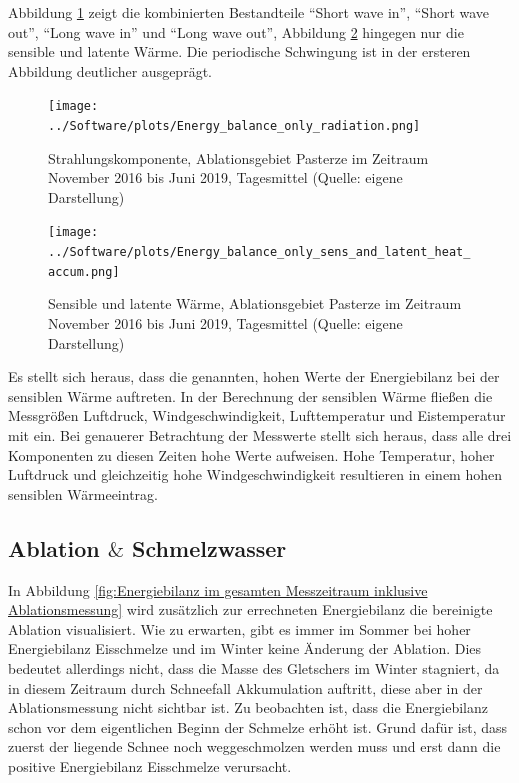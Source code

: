 \documentclass[11pt,a4paper]{article}
\begin{document}
Abbildung \ref{fig:Nettostrahlung (SW und LW) im gesamten Messzeitraum} zeigt die kombinierten Bestandteile ``Short wave in'', ``Short wave out'', ``Long wave in'' und ``Long wave out'', Abbildung \ref{fig:Sensible und latente Wärme im gesamten Messzeitraum} hingegen nur die sensible und latente Wärme. Die periodische Schwingung ist in der ersteren Abbildung deutlicher ausgeprägt.

\begin{figure}[H]
\centering
\texttt{[image: ../Software/plots/Energy\_balance\_only\_radiation.png]}
\caption[Strahlungskomponente, Ablationsgebiet Pasterze im Zeitraum November 2016 bis Juni 2019, Tagesmittel]{Strahlungskomponente, Ablationsgebiet Pasterze im Zeitraum November 2016 bis Juni 2019, Tagesmittel (Quelle: eigene Darstellung)}
\label{fig:Nettostrahlung (SW und LW) im gesamten Messzeitraum}
\end{figure}

\begin{figure}[H]
\centering
\texttt{[image: ../Software/plots/Energy\_balance\_only\_sens\_and\_latent\_heat\_accum.png]}
\caption[Sensible und latente Wärme, Ablationsgebiet Pasterze im Zeitraum November 2016 bis Juni 2019, Tagesmittel]{Sensible und latente Wärme, Ablationsgebiet Pasterze im Zeitraum November 2016 bis Juni 2019, Tagesmittel (Quelle: eigene Darstellung)}
\label{fig:Sensible und latente Wärme im gesamten Messzeitraum}
\end{figure}

Es stellt sich heraus, dass die genannten, hohen Werte der Energiebilanz bei der sensiblen Wärme auftreten. In der Berechnung der sensiblen Wärme fließen die Messgrößen Luftdruck, Windgeschwindigkeit, Lufttemperatur und Eistemperatur mit ein. Bei genauerer Betrachtung der Messwerte stellt sich heraus, dass alle drei Komponenten zu diesen Zeiten hohe Werte aufweisen. Hohe Temperatur, hoher Luftdruck und gleichzeitig hohe Windgeschwindigkeit resultieren in einem hohen sensiblen Wärmeeintrag. 


\subsection{Ablation $\&$ Schmelzwasser}
In Abbildung \ref{fig:Energiebilanz im gesamten Messzeitraum inklusive Ablationsmessung} wird zusätzlich zur errechneten Energiebilanz die bereinigte Ablation visualisiert. Wie zu erwarten, gibt es immer im Sommer bei hoher Energiebilanz Eisschmelze und im Winter keine Änderung der Ablation. Dies bedeutet allerdings nicht, dass die Masse des Gletschers im Winter stagniert, da in diesem Zeitraum durch Schneefall Akkumulation auftritt, diese aber in der Ablationsmessung nicht sichtbar ist. Zu beobachten ist, dass die Energiebilanz schon vor dem eigentlichen Beginn der Schmelze erhöht ist. Grund dafür ist, dass zuerst der liegende Schnee noch weggeschmolzen werden muss und erst dann die positive Energiebilanz Eisschmelze verursacht.
\end{document}

